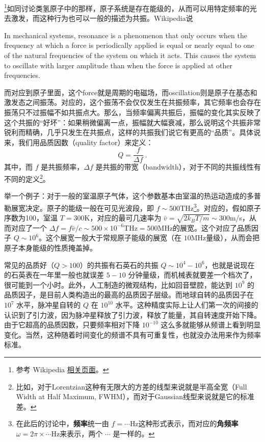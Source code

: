 


\begin{issues}
\issueMissDepend
\end{issues}


\footnote{参考 Wikipedia \href{https://en.wikipedia.org/wiki/Resonance}{相关页面}。}如同讨论类氢原子中的那样，原子系统是存在能级的，从而可以用特定频率的光去激发，而这种行为也可以一般的描述为共振。Wikipedia说

In mechanical systems, resonance is a phenomenon that only occurs when the frequency at which a force is periodically applied is equal or nearly equal to one of the natural frequencies of the system on which it acts. This causes the system to oscillate with larger amplitude than when the force is applied at other frequencies.

而对应到原子里面，这个force就是周期的电磁场，而oscillation则是原子在基态和激发态之间振荡。对应的，这个振荡不会仅仅发生在共振频率，其它频率也会存在振荡只不过振幅不如共振点大。那么，当频率偏离共振后，振幅的变化其实反映了这个共振的“好坏”：如果稍微偏离一点，振幅就大幅衰减，那么说明这个共振非常锐利而精确，几乎只发生在共振点，这样的共振我们说它有更高的“品质”。具体说来，我们用品质因数（quality factor）来定义：
\begin{equation}
Q = \frac{f}{\Delta f}~.
\end{equation}
其中，而 $f$ 是共振频率，$\Delta f$ 是共振的带宽（bandwidth），对于不同的共振线性有不同的定义\footnote{比如，对于Lorentzian这种有无限大的方差的线型来说就是半高全宽（Full Width at Half Maximum, FWHM），而对于Gaussian线型来说就是它的标准差。}。

举一个例子：对于一般的室温原子气体，这个参数基本由室温的热运动造成的多普勒展宽决定。原子的能级一般在可见光波段，即 $f\sim 500$THz\footnote{在此后的讨论中，\textbf{频率}统一由 $f=\cdots$Hz这种形式表示，而对应的\textbf{角频率}$\omega=2\pi\times\cdots$Hz来表示，两个 $\cdots$ 是一样的。}。对应的，假如原子序数为100，室温 $T=300$K，对应的最可几速率为 $\bar{v}=\sqrt{2k_BT/m}\sim300$m/s，从而对应了一个 $\Delta f=f\bar{v}/c\sim500\times10^{-6}$THz$=500$MHz的展宽。这个对应了品质因子 $Q\sim10^6$。这个展宽一般大于常规原子能级的展宽（在 $10$MHz量级），从而会把原子本身能级的性质掩盖掉。

常见的品质好（$Q>100$）的共振有石英石的共振 $Q\sim10^4-10^6$，也就是说现在的石英表在一年里一般也就误差 $5-10$ 分钟量级，而机械表就要差一个档次了，很可能到一个小时。此外，人工制造的微观结构，比如回音壁腔，能达到 $10^9$ 的品质因子，是目前人类构造出的最高的品质因子层级。而地球自转的品质因子在 $10^7$ 水平，脉冲星自转的 $Q$ 在 $10^{10}$ 水平。这种精度实际上让人们第一次的间接的认识到了引力波，因为脉冲星释放了引力波，释放了能量，其自转速度开始下降。由于它超高的品质因数，只要频率相对下降 $10^{-10}$ 这么多就能够从频谱上看到明显变化。当然，这种随着时间变化的频谱不具有可重复性，也就没办法用来作为频率标准。

